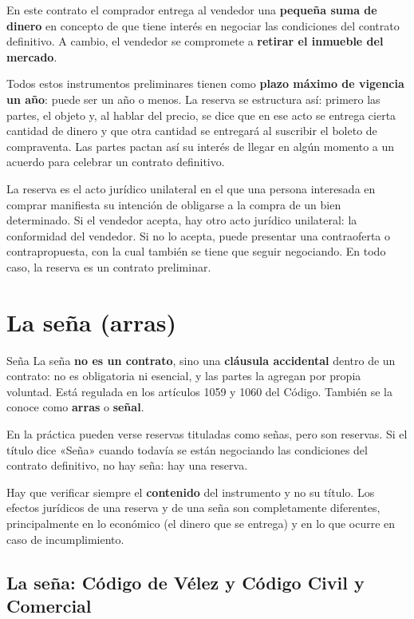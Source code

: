 \documentclass[12pt,oneside]{book}
\begin{document}
En este contrato el comprador entrega al vendedor una \textbf{pequeña suma de dinero} en concepto de que tiene interés en negociar las condiciones del contrato definitivo. A cambio, el vendedor se compromete a \textbf{retirar el inmueble del mercado}.

Todos estos instrumentos preliminares tienen como \textbf{plazo máximo de vigencia un año}: puede ser un año o menos. La reserva se estructura así: primero las partes, el objeto y, al hablar del precio, se dice que en ese acto se entrega cierta cantidad de dinero y que otra cantidad se entregará al suscribir el boleto de compraventa. Las partes pactan así su interés de llegar en algún momento a un acuerdo para celebrar un contrato definitivo.

La reserva es el acto jurídico unilateral en el que una persona interesada en comprar manifiesta su intención de obligarse a la compra de un bien determinado. Si el vendedor acepta, hay otro acto jurídico unilateral: la conformidad del vendedor. Si no lo acepta, puede presentar una contraoferta o contrapropuesta, con la cual también se tiene que seguir negociando. En todo caso, la reserva es un contrato preliminar.

\section{La seña (arras)}

\begin{definition}{Seña}
La seña \textbf{no es un contrato}, sino una \textbf{cláusula accidental} dentro de un contrato: no es obligatoria ni esencial, y las partes la agregan por propia voluntad. Está regulada en los artículos 1059 y 1060 del Código. También se la conoce como \textbf{arras} o \textbf{señal}.
\end{definition}

En la práctica pueden verse reservas tituladas como señas, pero son reservas. Si el título dice «Seña» cuando todavía se están negociando las condiciones del contrato definitivo, no hay seña: hay una reserva.

\begin{important}
Hay que verificar siempre el \textbf{contenido} del instrumento y no su título. Los efectos jurídicos de una reserva y de una seña son completamente diferentes, principalmente en lo económico (el dinero que se entrega) y en lo que ocurre en caso de incumplimiento.
\end{important}

\subsection{La seña: Código de Vélez y Código Civil y Comercial}
\end{document}
